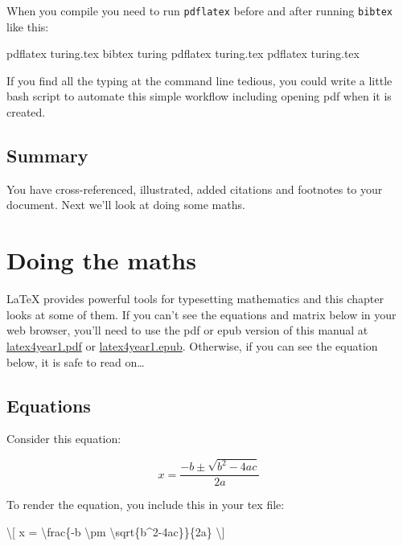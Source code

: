 \documentclass[
]{book}
\newenvironment{Shaded}{\begin{snugshade}}{\end{snugshade}}
\newcommand{\NormalTok}[1]{#1}
\newcommand{\SpecialCharTok}[1]{\textcolor[rgb]{0.00,0.00,0.00}{#1}}
\newcommand{\SpecialStringTok}[1]{\textcolor[rgb]{0.31,0.60,0.02}{#1}}
\begin{document}
When you compile you need to run \texttt{pdflatex} before and after running \texttt{bibtex} like this:

\begin{Shaded}
\begin{Highlighting}[]
\NormalTok{pdflatex turing.tex}
\NormalTok{bibtex turing}
\NormalTok{pdflatex turing.tex}
\NormalTok{pdflatex turing.tex}
\end{Highlighting}
\end{Shaded}

If you find all the typing at the command line tedious, you could write a little bash script to automate this simple workflow including opening pdf when it is created.

\hypertarget{fingconc}{%
\section{Summary}\label{fingconc}}

You have cross-referenced, illustrated, added citations and footnotes to your document. Next we'll look at doing some maths.

\hypertarget{maths}{%
\chapter{Doing the maths}\label{maths}}

LaTeX provides powerful tools for typesetting mathematics and this chapter looks at some of them. If you can't see the equations and matrix below in your web browser, you'll need to use the pdf or epub version of this manual at \href{https://latex4year1.netlify.app/latex4year1.pdf}{latex4year1.pdf} or \href{https://latex4year1.netlify.app/latex4year1.epub}{latex4year1.epub}. Otherwise, if you can see the equation below, it is safe to read on\ldots{}

\hypertarget{equations}{%
\section{Equations}\label{equations}}

Consider this equation:

\[ x = \frac{-b \pm \sqrt{b^2-4ac}}{2a} \]

To render the equation, you include this in your tex file:

\begin{Shaded}
\begin{Highlighting}[]
     \SpecialStringTok{\textbackslash{}[ x = }\SpecialCharTok{\textbackslash{}frac}\SpecialStringTok{\{{-}b }\SpecialCharTok{\textbackslash{}pm}\SpecialStringTok{ }\SpecialCharTok{\textbackslash{}sqrt}\SpecialStringTok{\{b\^{}2{-}4ac\}\}\{2a\} \textbackslash{}]}
\end{Highlighting}
\end{Shaded}
\end{document}
